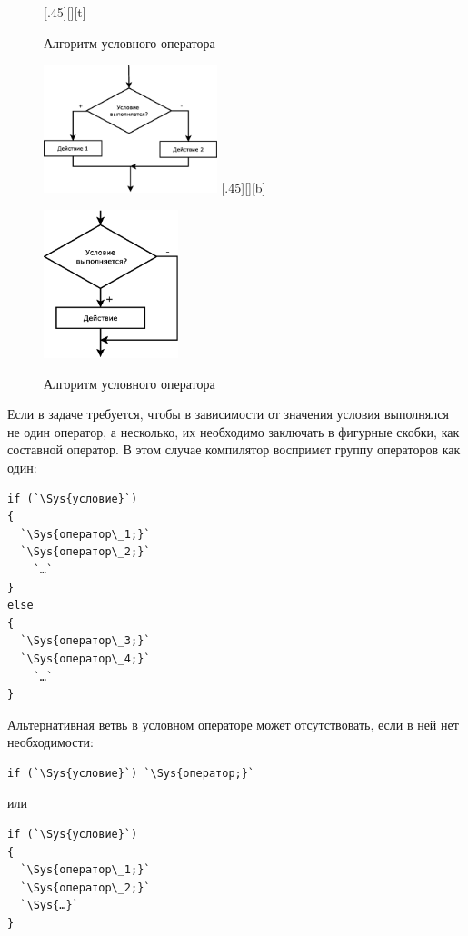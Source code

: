 \begin{figure}[H]
\begin{floatrow}
[.45\textwidth][\FBheight][t]
{\caption{Алгоритм условного оператора }
\label{ch03:refDrawing7}}
{\includegraphics[width=0.45\textwidth,keepaspectratio]{img/ris_3_8}}\hspace*{0.05\textwidth}
%
[.45\textwidth][\FBheight][b]
{\caption{Алгоритм условного оператора }
\label{ch03:refDrawing8}}
{\includegraphics[width=0.35\textwidth]{img/ris_3_9}}
\end{floatrow}
\end{figure}

 Если в задаче требуется, чтобы в зависимости от значения условия выполнялся не один оператор, а
несколько, их необходимо заключать в фигурные скобки, как составной оператор. В этом случае компилятор воспримет группу
операторов как один:
\begin{lstlisting}
if (`\Sys{условие}`) 
{
  `\Sys{оператор\_1;}`
  `\Sys{оператор\_2;}`
    `…`
}
else 
{
  `\Sys{оператор\_3;}`
  `\Sys{оператор\_4;}`
    `…`
}
\end{lstlisting}

Альтернативная ветвь  в условном операторе может отсутствовать, если в ней нет необходимости: 
\begin{lstlisting}
if (`\Sys{условие}`) `\Sys{оператор;}`
\end{lstlisting}
или
\begin{lstlisting}
if (`\Sys{условие}`)
{
  `\Sys{оператор\_1;}`
  `\Sys{оператор\_2;}`
  `\Sys{…}`
}
\end{lstlisting}

